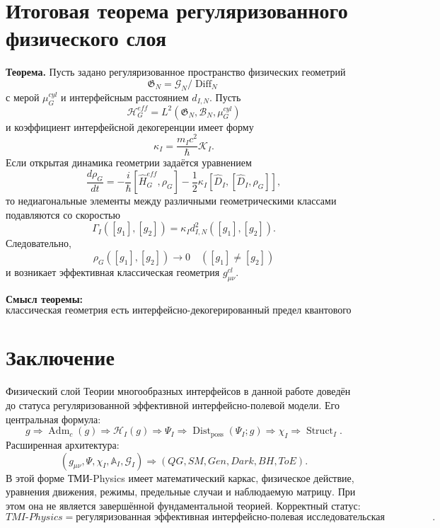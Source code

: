 \documentclass[12pt,a4paper]{article}
\DeclareMathOperator{\Adm}{Adm}
\DeclareMathOperator{\Struct}{Struct}
\DeclareMathOperator{\Dist}{Dist}
\DeclareMathOperator{\Diff}{Diff}
\newcommand{\Hilb}{\mathcal H}
\newcommand{\Acal}{\mathbb A_I}
\newcommand{\gfrak}{\mathfrak G}
\begin{document}
\section{Итоговая теорема регуляризованного физического слоя}
\textbf{Теорема.} Пусть задано регуляризованное пространство физических геометрий
\[
\boxed{\gfrak_N=\mathcal G_N/\Diff_N}
\]
с мерой $\mu_G^{cyl}$ и интерфейсным расстоянием $d_{I,N}$. Пусть
\[
\boxed{\Hilb_G^{eff}=L^2(\gfrak_N,\mathcal B_N,\mu_G^{cyl})}
\]
и коэффициент интерфейсной декогеренции имеет форму
\[
\boxed{\kappa_I=\frac{m_Ic^2}{\hbar}\mathcal K_I.}
\]
Если открытая динамика геометрии задаётся уравнением
\[
\boxed{
\frac{d\rho_G}{dt}=-\frac{i}{\hbar}[\widehat H_G^{eff},\rho_G]
-\frac12\kappa_I[\widehat D_I,[\widehat D_I,\rho_G]],
}
\]
то недиагональные элементы между различными геометрическими классами подавляются со скоростью
\[
\boxed{\Gamma_I([g_1],[g_2])=\kappa_Id_{I,N}^2([g_1],[g_2]).}
\]
Следовательно,
\[
\boxed{\rho_G([g_1],[g_2])\to0\quad([g_1]\ne[g_2])}
\]
и возникает эффективная классическая геометрия $g_{\mu\nu}^{cl}$.

\textbf{Смысл теоремы:}
\[
\boxed{\text{классическая геометрия есть интерфейсно-декогерированный предел квантового распределения геометрий.}}
\]

\section{Заключение}
Физический слой Теории многообразных интерфейсов в данной работе доведён до статуса регуляризованной эффективной интерфейсно-полевой модели. Его центральная формула:
\[
\boxed{
 g\Rightarrow\Adm_c(g)\Rightarrow\Hilb_I(g)\Rightarrow\Psi_I
 \Rightarrow\Dist_{\mathrm{poss}}(\Psi_I;g)\Rightarrow\chi_I\Rightarrow\Struct_I.
}
\]
Расширенная архитектура:
\[
\boxed{(g_{\mu\nu},\Psi,\chi_I,\Acal,\mathcal G_I)
\Rightarrow(QG,SM,Gen,Dark,BH,ToE).}
\]
В этой форме ТМИ-Physics имеет математический каркас, физическое действие, уравнения движения, режимы, предельные случаи и наблюдаемую матрицу. При этом она не является завершённой фундаментальной теорией. Корректный статус:
\[
\boxed{TMI\text{-}Physics=\text{регуляризованная эффективная интерфейсно-полевая исследовательская программа}.}
\]

\appendix
\end{document}
